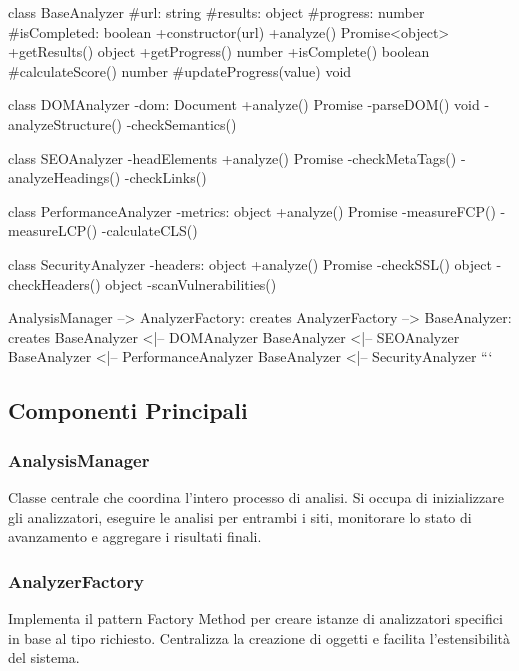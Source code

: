     class BaseAnalyzer {
        #url: string
        #results: object
        #progress: number
        #isCompleted: boolean
        +constructor(url)
        +analyze() Promise<object>
        +getResults() object
        +getProgress() number
        +isComplete() boolean
        #calculateScore() number
        #updateProgress(value) void
    }
    
    class DOMAnalyzer {
        -dom: Document
        +analyze() Promise
        -parseDOM() void
        -analyzeStructure()
        -checkSemantics()
    }
    
    class SEOAnalyzer {
        -headElements
        +analyze() Promise
        -checkMetaTags()
        -analyzeHeadings()
        -checkLinks()
    }
    
    class PerformanceAnalyzer {
        -metrics: object
        +analyze() Promise
        -measureFCP()
        -measureLCP()
        -calculateCLS()
    }
    
    class SecurityAnalyzer {
        -headers: object
        +analyze() Promise
        -checkSSL() object
        -checkHeaders() object
        -scanVulnerabilities()
    }
    
    AnalysisManager --> AnalyzerFactory: creates
    AnalyzerFactory --> BaseAnalyzer: creates
    BaseAnalyzer <|-- DOMAnalyzer
    BaseAnalyzer <|-- SEOAnalyzer
    BaseAnalyzer <|-- PerformanceAnalyzer
    BaseAnalyzer <|-- SecurityAnalyzer
```

\subsection{Componenti Principali}

\subsubsection{AnalysisManager}
Classe centrale che coordina l'intero processo di analisi. Si occupa di inizializzare gli analizzatori, eseguire le analisi per entrambi i siti, monitorare lo stato di avanzamento e aggregare i risultati finali.

\subsubsection{AnalyzerFactory}
Implementa il pattern Factory Method per creare istanze di analizzatori specifici in base al tipo richiesto. Centralizza la creazione di oggetti e facilita l'estensibilità del sistema.

